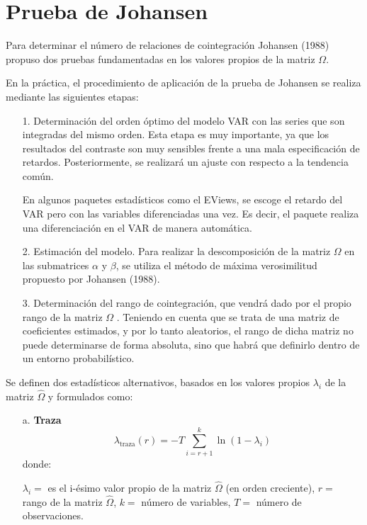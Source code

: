 \section{Prueba de Johansen}
Para determinar el n\'{u}mero de relaciones de cointegraci\'{o}n Johansen (1988) propuso dos pruebas fundamentadas en los valores propios de la matriz $\Omega$.\newline

En la pr\'{a}ctica, el procedimiento de aplicaci\'{o}n de la prueba de Johansen se realiza mediante las siguientes etapas:

\begin{enumerate}
      \item[1.] Determinaci\'{o}n del orden \'{o}ptimo del modelo VAR con las series que son integradas del mismo orden. Esta etapa es muy importante, ya que los resultados del contraste son muy sensibles frente a una mala especificaci\'{o}n de retardos. Posteriormente, se realizar\'{a} un ajuste con respecto a la tendencia com\'{u}n.
      
      En algunos paquetes estad\'{i}sticos como el EViews, se escoge el retardo del VAR pero con las variables diferenciadas una vez. Es decir, el paquete realiza una diferenciaci\'{o}n en el VAR de manera autom\'{a}tica.

      \item[2.] Estimaci\'{o}n del modelo. Para realizar la descomposici\'{o}n de la matriz $\Omega$ en las submatrices $\alpha$ y $\beta$, se utiliza el m\'{e}todo de m\'{a}xima verosimilitud propuesto por Johansen (1988).
      \item[3.] Determinaci\'{o}n del rango de cointegraci\'{o}n, que vendr\'{a} dado por el propio rango de la matriz $\Omega$ . Teniendo en cuenta que se trata de una matriz de coeficientes estimados, y por lo tanto aleatorios, el rango de dicha matriz no puede determinarse de forma absoluta, sino que habr\'{a} que definirlo dentro de un entorno probabil\'{i}stico.
\end{enumerate}

Se definen dos estad\'{i}sticos alternativos, basados en los valores propios $\lambda_{i}$ de la matriz $\hat{\Omega }$ y formulados como:


\begin{enumerate}
\item[a.] {\bf Traza}
\[
\lambda_{\text{traza}}( r )=-T\sum_{i=r+1}^k \ln(1-\lambda_{i})
\]
donde:\newline

$\lambda_{i}=$ es el i-\'{e}simo valor propio de la matriz $\hat{\Omega}$ (en orden creciente),\newline
$r=$ rango de la matriz $\hat{\Omega }$,\newline
$k=$ n\'{u}mero de variables,\newline
$T=$ n\'{u}mero de observaciones.
\end{enumerate}

